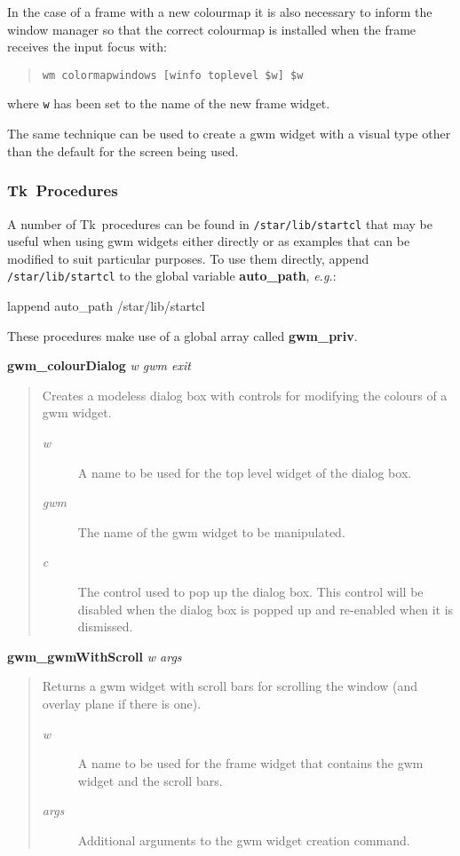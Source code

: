 \documentclass[twoside,11pt,nolof]{starlink}
\newenvironment{rquote}{\begin{quote}\raggedright}{\end{quote}}
\newenvironment{tquote}{\begin{quote}\raggedright}{\end{quote}}
\providecommand{\Tk}{{\textsf{Tk}}}
\begin{document}
In the case of a frame with a new colourmap it is also necessary to inform
the window manager so that the correct colourmap is installed when the
frame receives the input focus with:
\begin{tquote}\texttt{wm colormapwindows [winfo toplevel \$w] \$w
}\end{tquote}
where \texttt{w} has been set to the name of the new frame widget.

The same technique can be used to create a gwm widget with a visual type
other than the default for the screen being used.

\subsubsection{\Tk\ Procedures}

A number of \Tk\ procedures can be found in {\tt{/star/lib/startcl}} that may
be useful when using gwm widgets either directly or as examples that can be
modified to suit particular purposes. To use them directly, append
\texttt{/star/lib/startcl} to the global variable \textbf{auto\_path}, {\em{e.g.}}:

\begin{terminalv}
lappend auto_path /star/lib/startcl
\end{terminalv}

These procedures make use of a global array called \textbf{gwm\_priv}.

\textbf{gwm\_colourDialog} \emph{w gwm exit}
\begin{rquote}
Creates a modeless dialog box with controls for modifying the colours of
a gwm widget.

\begin{description}
\item[\emph{w}] A name to be used for the top level widget of the dialog box.
\item[\emph{gwm}] The name of the gwm widget to be manipulated.
\item[\emph{c}] The control used to pop up the dialog box. This control will
be disabled when the dialog box is popped up and re-enabled when it is
dismissed.

\end{description}
\end{rquote}

\textbf{gwm\_gwmWithScroll} \emph{w args}
\begin{rquote}
Returns a gwm widget with scroll bars for scrolling the window (and  overlay
plane if there is one).
\begin{description}
\item[\emph{w}] A name to be used for the frame widget that contains the gwm
widget and the scroll bars.
\item[\emph{args}] Additional arguments to the gwm widget creation command.
\end{description}
\end{rquote}
\end{document}
